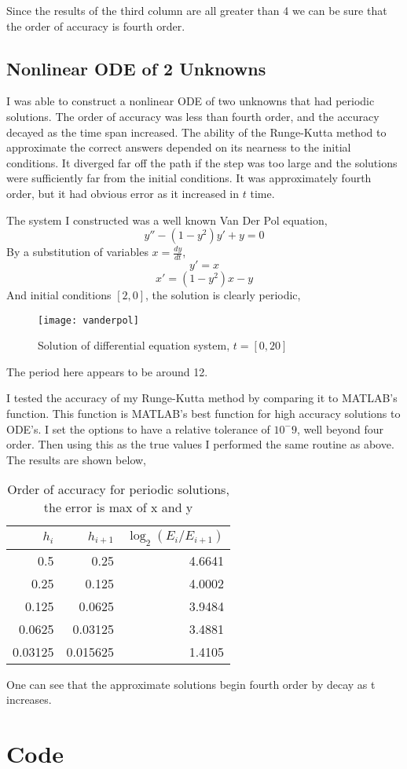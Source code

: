 \documentclass[]{article}
\begin{document}
Since the results of the  third column are all greater than 4 we can be sure that the order of accuracy is fourth order. 
	
\subsection*{Nonlinear ODE of 2 Unknowns} I was able to construct a nonlinear ODE of two unknowns that had periodic solutions. The order of accuracy was less than fourth order, and the accuracy decayed as the time span increased. The ability of the Runge-Kutta method to approximate the correct answers depended on its nearness to the initial conditions. It diverged far off the path if the step was too large and the solutions were sufficiently far from the initial conditions. It was approximately fourth order, but it had obvious error as it increased in $ t $ time. 

The system I constructed was a well known Van Der Pol equation, 
\[ y'' - (1 - y^2) y' + y = 0  \]
By a substitution of variables $ x = \frac{dy}{dt} $, 
\[ y' = x \]
\[ x' = (1-y^2)x - y \]
And initial conditions $ [2,0] $, the solution is clearly periodic, 
\begin{figure}\centering
	\caption{Solution of differential equation system, $ t = [0,20] $}
\texttt{[image: vanderpol]}
\end{figure}
The period here appears to be around 12.

I  tested the accuracy of my Runge-Kutta method by comparing it to MATLAB's  function. This function is MATLAB's best function for high accuracy solutions to ODE's. I set the  options to have a relative tolerance of $ 10^-9 $, well beyond four order. Then using this as the true values I performed the same routine as above. The results are shown below, 

\begin{table}[H]
	\centering
	\caption{Order of accuracy for periodic solutions, the error is max of x and y}
	\begin{tabular}{rrr}
		$ h_i $ & $ h_{i+1} $ & $ \log_2(E_i/E_{i+1}) $\\
		\hline 
		\hline 
		0.5 & 0.25 & 4.6641\\
		0.25 & 0.125 & 4.0002\\
		0.125 & 0.0625 & 3.9484\\ 
		0.0625 &  0.03125 & 3.4881 \\
		0.03125 & 0.015625 &  1.4105\\
	\end{tabular}
\end{table}
One can see that the approximate solutions begin fourth order by decay as t increases. 
\newpage	
\appendix
\section{Code}	



	

	
	
	
	
	
\end{document}
